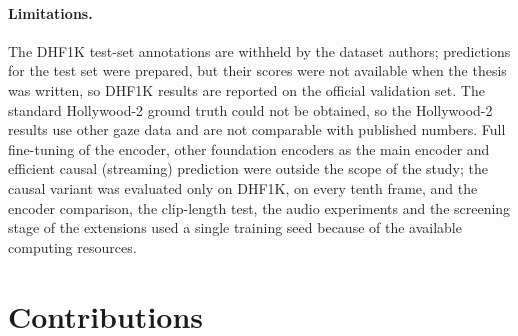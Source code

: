 \paragraph{Limitations.} The DHF1K test-set annotations are withheld by the
dataset authors; predictions for the test set were prepared, but their scores
were not available when the thesis was written, so DHF1K results are reported on
the official validation set. The standard Hollywood-2 ground truth could not be
obtained, so the Hollywood-2 results use other gaze data and are not comparable
with published numbers. Full fine-tuning of the encoder, other foundation
encoders as the main encoder and efficient causal (streaming) prediction were
outside the scope of the study; the causal variant was evaluated only on DHF1K, on every tenth frame,
and the encoder comparison, the clip-length test, the audio experiments and the
screening stage of the extensions used a single training seed because of the
available computing resources.

\section{Contributions}\label{sec:contributions}



